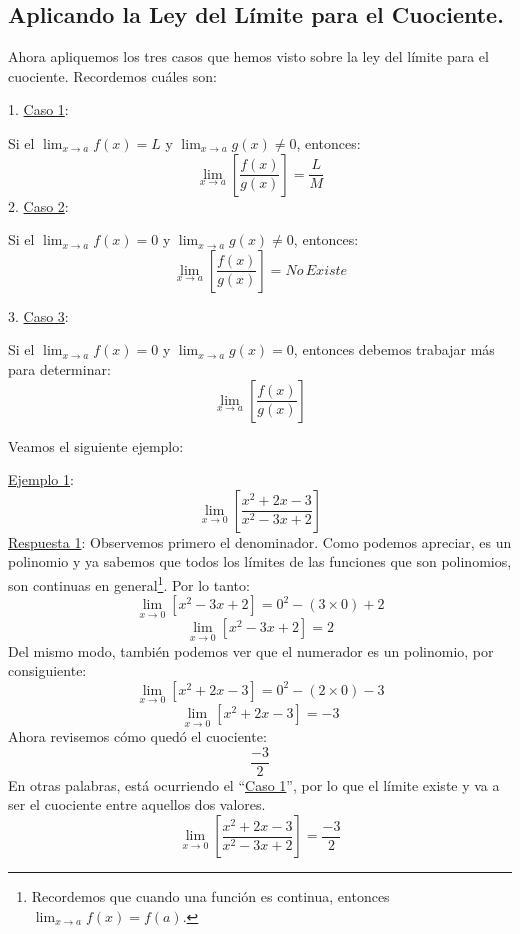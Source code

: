 \documentclass[12pt]{article}
\begin{document}
\subsection{Aplicando la Ley del Límite para el Cuociente.}

Ahora apliquemos los tres casos que hemos visto sobre la ley del límite para el cuociente. Recordemos cuáles son:

1. \underline{Caso 1}:

Si el $\lim_{x \to a}f(x) = L$ y $\lim_{x \to a} g(x) \neq 0$, entonces:
\[\lim_{x \to a} \left[\frac{f(x)}{g(x)}\right] = \frac{L}{M}\]
2. \underline{Caso 2}:

Si el $\lim_{x \to a}f(x) = 0$ y $\lim_{x \to a} g(x) \neq 0$, entonces:
\[\lim_{x \to a} \left[\frac{f(x)}{g(x)}\right] = No \, Existe\]

\newpage

3. \underline{Caso 3}:

Si el $\lim_{x \to a}f(x) = 0$ y $\lim_{x \to a} g(x) = 0$, entonces debemos trabajar más para determinar:
\[\lim_{x \to a} \left[\frac{f(x)}{g(x)}\right]\]

Veamos el siguiente ejemplo:

\underline{Ejemplo 1}:
\[\lim_{x \to 0} \left[\frac{x^{2} + 2x - 3}{x^{2} - 3x + 2}\right]\]
\underline{Respuesta 1}: Observemos primero el denominador. Como podemos apreciar, es un polinomio y ya sabemos que todos los límites de las funciones que son polinomios, son continuas en general\footnote{Recordemos que cuando una función es continua, entonces $\lim_{x \to a} f(x) = f(a)$.}. Por lo tanto:
\[\lim_{x \to 0}[x^{2} - 3x + 2] = 0^{2} - (3 \times 0) + 2\]
\[\lim_{x \to 0}[x^{2} - 3x + 2] = 2\]
Del mismo modo, también podemos ver que el numerador es un polinomio, por consiguiente:
\[\lim_{x \to 0}[x^{2} + 2x - 3] = 0^{2} - (2 \times 0) - 3\]
\[\lim_{x \to 0}[x^{2} + 2x - 3] = -3\]
Ahora revisemos cómo quedó el cuociente:
\[\frac{- 3}{2}\]
En otras palabras, está ocurriendo el ``\underline{Caso 1}'', por lo que el límite existe y va a ser el cuociente entre aquellos dos valores.
\[\lim_{x \to 0} \left[\frac{x^{2} + 2x - 3}{x^{2} - 3x + 2}\right] = \frac{- 3}{2}\]
\end{document}
